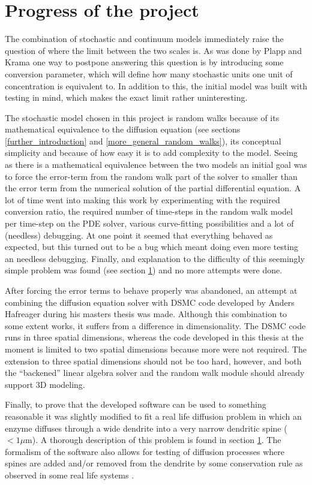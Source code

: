 \documentclass[main.tex]{subfiles}
\begin{document}
\section{Progress of the project}
The combination of stochastic and continuum models immediately raise the question of where the limit between the two scales is. 
As was done by Plapp and Krama \cite{plapp2000multiscale} one way to postpone answering this question is by introducing some conversion parameter, which will define how many stochastic units one unit of concentration is equivalent to. 
In addition to this, the initial model was built with testing in mind, which makes the exact limit rather uninteresting. 

The stochastic model chosen in this project is random walks because of its mathematical equivalence to the diffusion equation (see sections \ref{further_introduction} and \ref{more_general_random_walks}), its conceptual simplicity and because of how easy it is to add complexity to the model. 
Seeing as there is a mathematical equivalence between the two models an initial goal was to force the error-term from the random walk part of the solver to smaller than the error term from the numerical solution of the partial differential equation. 
A lot of time went into making this work by experimenting with the required conversion ratio, the required number of time-steps in the random walk model per time-step on the PDE solver, various curve-fitting possibilities and a lot of (needless) debugging. 
At one point it seemed that everything behaved as expected, but this turned out to be a bug which meant doing even more testing an needless debugging. 
Finally, and explanation to the difficulty of this seemingly simple problem was found (see section \ref{}) and no more attempts were done. 

After forcing the error terms to behave properly was abandoned, an attempt at combining the diffusion equation solver with DSMC code developed by Anders Hafreager during his masters thesis was made. 
Although this combination to some extent works, it suffers from a difference in dimensionality. 
The DSMC code runs in three spatial dimensions, whereas the code developed in this thesis at the moment is limited to two spatial dimensions because more were not required. 
The extension to three spatial dimensions should not be too hard, however, and both the ``backened'' linear algebra solver and the random walk module should already support 3D modeling. 

Finally, to prove that the developed software can be used to something reasonable it was slightly modified to fit a real life diffusion problem in which an enzyme diffuses through a wide dendrite into a very narrow dendritic spine ($<1\mu$m). 
A thorough description of this problem is found in section \ref{}.
The formalism of the software also allows for testing of diffusion processes where spines are added and/or removed from the dendrite by some conservation rule as observed in some real life systems \cite{}.
\end{document}
